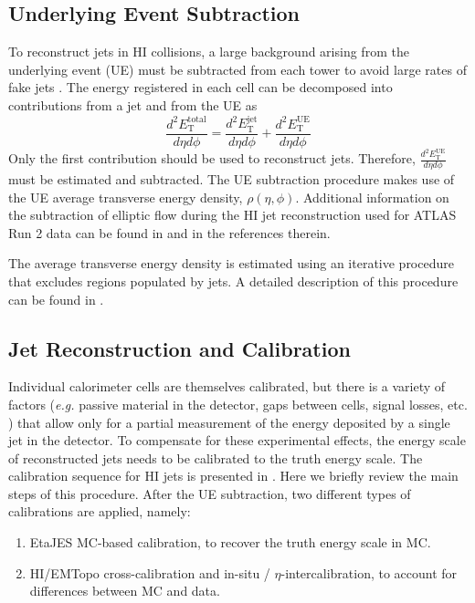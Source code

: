 \documentclass[NOTE, atlasdraft=true, texlive=2020, UKenglish]{atlasdoc}
\newcommand{\TN}[1]{ \text{#1} }
\begin{document}
\subsection{Underlying Event Subtraction}
To reconstruct jets in HI collisions, a large background arising from the underlying event (UE) must be subtracted from each tower to avoid large rates of fake jets \cite{PhysRevC.86.024908}. The energy registered in each cell can be decomposed into contributions from a jet and from the UE as
\begin{equation}
    \frac{d^2E_{\TN{T}}^{\TN{total}}}{d\eta d\phi}=\frac{d^2E_{\TN{T}}^{\TN{jet}}}{d\eta d\phi}+\frac{d^2E_{\TN{T}}^{\TN{UE}}}{d\eta d\phi}
\end{equation}
Only the first contribution should be used to reconstruct jets. Therefore, $\frac{d^2E_{\TN{T}}^{\TN{UE}}}{d\eta d\phi}$ must be estimated and subtracted. 
The UE subtraction procedure makes use of the UE average transverse energy density, $\rho (\eta,\phi)$. 
Additional information on the subtraction of elliptic flow during the HI jet reconstruction used for ATLAS Run 2 data can be found in \cite{Rinn:2711618, Rybar:2688696, Longo:2860813} and in the references therein. 

The average transverse energy density is estimated using an iterative procedure that excludes regions populated by jets. A detailed description of this procedure can be found in \cite{Rinn:2711618}. 


\subsection{Jet Reconstruction and Calibration}
Individual calorimeter cells are themselves calibrated, but there is a variety of factors (\textit{e.g.} passive material in the detector, gaps between cells, signal losses, etc. \cite{PERF-2011-03}) that allow only for a partial measurement of the energy deposited by a single jet in the detector. To compensate for these experimental effects, the energy scale of reconstructed jets needs to be calibrated to the truth energy scale. 
The calibration sequence for HI jets is presented in \cite{Krivos:2706256}. 
Here we briefly review the main steps of this procedure. 
After the UE subtraction, two different types of calibrations are applied, namely: 
\begin{enumerate}
    \item EtaJES MC-based calibration, to recover the truth energy scale in MC. 
    \item HI/EMTopo cross-calibration and in-situ / $\eta$-intercalibration, to account for differences between MC and data. 
\end{enumerate}
\end{document}
